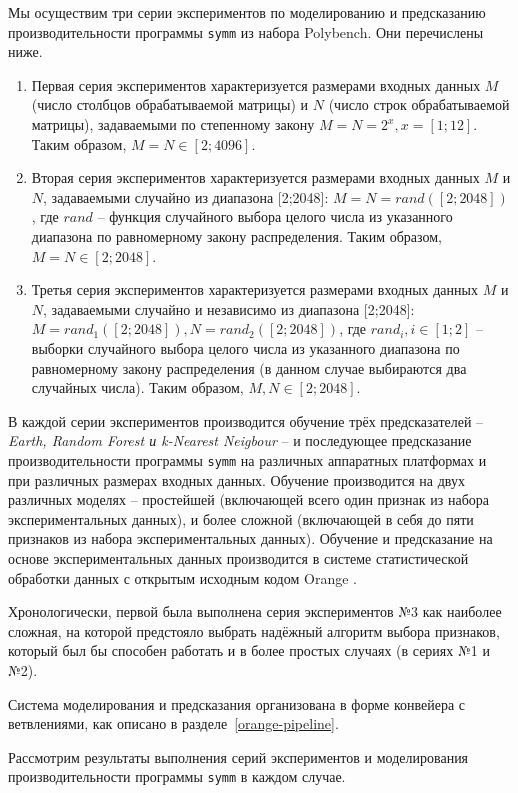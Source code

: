 Мы осуществим три серии экспериментов по моделированию и предсказанию производительности программы \texttt{symm} из набора Polybench. Они перечислены ниже.
\begin{enumerate}
    \item Первая серия экспериментов характеризуется размерами входных данных $M$ (число столбцов обрабатываемой матрицы) и $N$ (число строк обрабатываемой матрицы), задаваемыми по степенному закону $M = N = 2^x, x = [1;12]$. Таким образом, $M = N \in [2;4096]$.
    \item Вторая серия экспериментов характеризуется размерами входных данных $M$ и $N$, задаваемыми случайно из диапазона [2;2048]: $M = N = rand([2;2048])$, где $rand$ -- функция случайного выбора целого числа из указанного диапазона по равномерному закону распределения. Таким образом, $M = N \in [2;2048]$.
    \item Третья серия экспериментов характеризуется размерами входных данных $M$ и $N$, задаваемыми случайно и независимо из диапазона [2;2048]: $M = rand_1([2;2048]), N = rand_2([2;2048])$, где $rand_i, i \in [1;2]$ -- выборки случайного выбора целого числа из указанного диапазона по равномерному закону распределения (в данном случае выбираются два случайных числа). Таким образом, $M, N \in [2;2048]$.
\end{enumerate}

В каждой серии экспериментов производится обучение трёх предсказателей -- \textit{Earth, Random Forest и k-Nearest Neigbour} -- и последующее предсказание производительности программы \texttt{symm} на различных аппаратных платформах и при различных размерах входных данных. Обучение производится на двух различных моделях -- простейшей (включающей всего один признак из набора экспериментальных данных), и более сложной (включающей в себя до пяти признаков из набора экспериментальных данных). Обучение и предсказание на основе экспериментальных данных производится в системе статистической обработки данных с открытым исходным кодом Orange \cite{orange}.

Хронологически, первой была выполнена серия экспериментов №3 как наиболее сложная, на которой предстояло выбрать надёжный алгоритм выбора признаков, который был бы способен работать и в более простых случаях (в сериях №1 и №2).

Система моделирования и предсказания организована в форме конвейера с ветвлениями, как описано в разделе~\ref{orange-pipeline}.

Рассмотрим результаты выполнения серий экспериментов и моделирования производительности программы \texttt{symm} в каждом случае.

